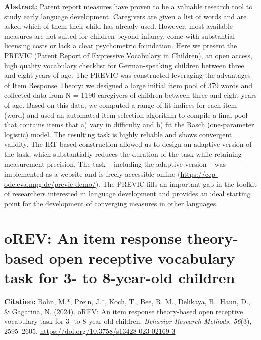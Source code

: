 \documentclass[
]{scrbook}
\begin{document}
\textbf{Abstract:} Parent report measures have proven to be a valuable research tool to study early language development. Caregivers are given a list of words and are asked which of them their child has already used. However, most available measures are not suited for children beyond infancy, come with substantial licensing costs or lack a clear psychometric foundation. Here we present the PREVIC (Parent Report of Expressive Vocabulary in Children), an open access, high quality vocabulary checklist for German-speaking children between three and eight years of age. The PREVIC was constructed leveraging the advantages of Item Response Theory: we designed a large initial item pool of 379 words and collected data from N = 1190 caregivers of children between three and eight years of age. Based on this data, we computed a range of fit indices for each item (word) and used an automated item selection algorithm to compile a final pool that contains items that a) vary in difficulty and b) fit the Rasch (one-parameter logistic) model. The resulting task is highly reliable and shows convergent validity. The IRT-based construction allowed us to design an adaptive version of the task, which substantially reduces the duration of the task while retaining measurement precision. The task -- including the adaptive version -- was implemented as a website and is freely accessible online (\mbox{\url{https://ccp-odc.eva.mpg.de/previc-demo/}}). The PREVIC fills an important gap in the toolkit of researchers interested in language development and provides an ideal starting point for the development of converging measures in other languages.

\newpage

\section*{oREV: An item response theory-based open receptive vocabulary task for 3- to 8-year-old children}\label{orev}

\textbf{Citation:} Bohn, M.*, Prein, J.*, Koch, T., Bee, R. M., Delikaya, B., Haun, D., \& Gagarina, N. (2024). oREV: An item response theory-based open receptive vocabulary task for 3- to 8-year-old children. \emph{Behavior Research Methods, 56}(3), 2595--2605. \mbox{\url{https://doi.org/10.3758/s13428-023-02169-3}}
\end{document}
